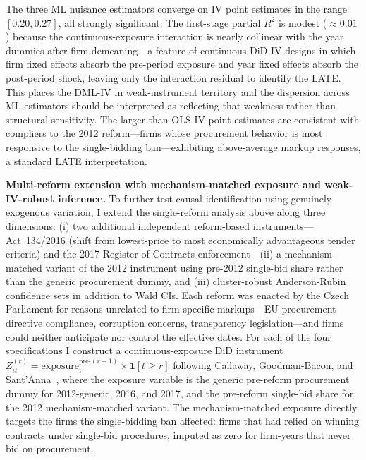 \documentclass[11pt]{article}
\begin{document}


The three ML nuisance estimators converge on IV point estimates in the range $[0.20, 0.27]$, all strongly significant. The first-stage partial $R^2$ is modest ($\approx 0.01$) because the continuous-exposure interaction is nearly collinear with the year dummies after firm demeaning---a feature of continuous-DiD-IV designs in which firm fixed effects absorb the pre-period exposure and year fixed effects absorb the post-period shock, leaving only the interaction residual to identify the LATE. This places the DML-IV in weak-instrument territory and the dispersion across ML estimators should be interpreted as reflecting that weakness rather than structural sensitivity. The larger-than-OLS IV point estimates are consistent with compliers to the 2012 reform---firms whose procurement behavior is most responsive to the single-bidding ban---exhibiting above-average markup responses, a standard LATE interpretation.

\textbf{Multi-reform extension with mechanism-matched exposure and weak-IV-robust inference.} To further test causal identification using genuinely exogenous variation, I extend the single-reform analysis above along three dimensions: (i) two additional independent reform-based instruments---Act~134/2016 (shift from lowest-price to most economically advantageous tender criteria) and the 2017 Register of Contracts enforcement---(ii) a mechanism-matched variant of the 2012 instrument using pre-2012 single-bid share rather than the generic procurement dummy, and (iii) cluster-robust Anderson-Rubin~\cite{AndersonRubin1949} confidence sets in addition to Wald CIs. Each reform was enacted by the Czech Parliament for reasons unrelated to firm-specific markups---EU procurement directive compliance, corruption concerns, transparency legislation---and firms could neither anticipate nor control the effective dates. For each of the four specifications I construct a continuous-exposure DiD instrument $Z^{(r)}_{it} = \overline{\text{exposure}}_i^{\text{pre-}(r-1)} \times \mathbf{1}[t \geq r]$ following Callaway, Goodman-Bacon, and Sant'Anna~\cite{CallawayGoodmanBaconSantAnna2024}, where the exposure variable is the generic pre-reform procurement dummy for 2012-generic, 2016, and 2017, and the pre-reform single-bid share for the 2012 mechanism-matched variant. The mechanism-matched exposure directly targets the firms the single-bidding ban affected: firms that had relied on winning contracts under single-bid procedures, imputed as zero for firm-years that never bid on procurement.
\end{document}
